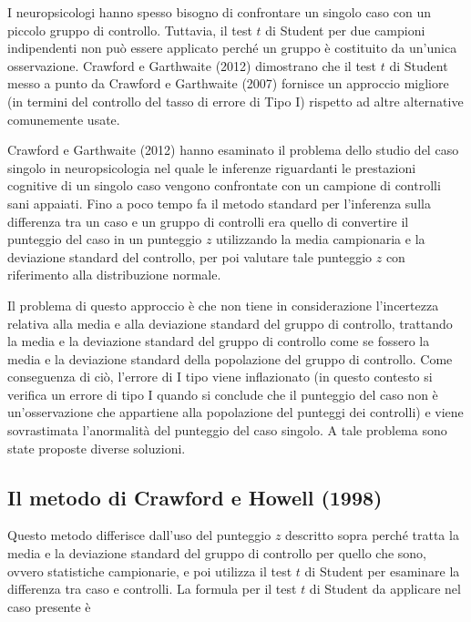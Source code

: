 \documentclass[
  11pt,
]{krantz}
\theoremstyle{definition}
\theoremstyle{definition}
\theoremstyle{definition}
\theoremstyle{definition}
\theoremstyle{remark}
\begin{document}
I neuropsicologi hanno spesso bisogno di confrontare un singolo caso con un piccolo gruppo di controllo. Tuttavia, il test \(t\) di Student per due campioni indipendenti non può essere applicato perché un gruppo è costituito da un'unica osservazione. Crawford e Garthwaite (2012) dimostrano che il test \(t\) di Student messo a punto da Crawford e Garthwaite (2007) fornisce un approccio migliore (in termini del controllo del tasso di errore di Tipo I) rispetto ad altre alternative comunemente usate.

Crawford e Garthwaite (2012) hanno esaminato il problema dello studio del caso singolo in neuropsicologia nel quale le inferenze riguardanti le prestazioni cognitive di un singolo caso vengono confrontate con un campione di controlli sani appaiati. Fino a poco tempo fa il metodo standard per l'inferenza sulla differenza tra un caso e un gruppo di controlli era quello di convertire il punteggio del caso in un punteggio \(z\) utilizzando la media campionaria e la deviazione standard del controllo, per poi valutare tale punteggio \(z\) con riferimento alla distribuzione normale.

Il problema di questo approccio è che non tiene in considerazione l'incertezza relativa alla media e alla deviazione standard del gruppo di controllo, trattando la media e la deviazione standard del gruppo di controllo come se fossero la media e la deviazione standard della popolazione del gruppo di controllo. Come conseguenza di ciò, l'errore di I tipo viene inflazionato (in questo contesto si verifica un errore di tipo I quando si conclude che il punteggio del caso non è un'osservazione che appartiene alla popolazione del punteggi dei controlli) e viene sovrastimata l'anormalità del punteggio del caso singolo. A tale problema sono state proposte diverse soluzioni.

\hypertarget{sec:Crawford-Howell-1998}{%
\subsection{Il metodo di Crawford e Howell (1998)}\label{sec:Crawford-Howell-1998}}

Questo metodo differisce dall'uso del punteggio \(z\) descritto sopra perché tratta la media e la deviazione standard del gruppo di controllo per quello che sono, ovvero statistiche campionarie, e poi utilizza il test \(t\) di Student per esaminare la differenza tra caso e controlli. La formula per il test \(t\) di Student da applicare nel caso presente è
\end{document}
